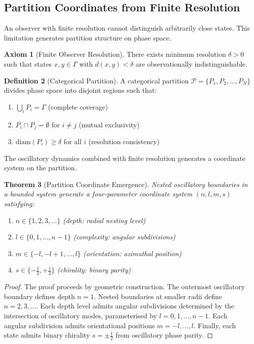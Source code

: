 \documentclass[twocolumn,10pt,a4paper]{article}
\newtheorem{theorem}{Theorem}[section]
\theoremstyle{definition}
\newtheorem{definition}[theorem]{Definition}
\newtheorem{axiom}[theorem]{Axiom}
\theoremstyle{remark}
\newcommand{\partition}{\mathcal{P}}
\begin{document}
\subsection{Partition Coordinates from Finite Resolution}

An observer with finite resolution cannot distinguish arbitrarily close states. This limitation generates partition structure on phase space.

\begin{axiom}[Finite Observer Resolution]
\label{ax:resolution}
There exists minimum resolution $\delta > 0$ such that states $x, y \in \Gamma$ with $d(x, y) < \delta$ are observationally indistinguishable.
\end{axiom}

\begin{definition}[Categorical Partition]
\label{def:categorical_partition}
A categorical partition $\partition = \{P_1, P_2, \ldots, P_N\}$ divides phase space into disjoint regions such that:
\begin{enumerate}
\item $\bigcup_i P_i = \Gamma$ (complete coverage)
\item $P_i \cap P_j = \emptyset$ for $i \neq j$ (mutual exclusivity)
\item $\mathrm{diam}(P_i) \geq \delta$ for all $i$ (resolution consistency)
\end{enumerate}
\end{definition}

The oscillatory dynamics combined with finite resolution generates a coordinate system on the partition.

\begin{theorem}[Partition Coordinate Emergence]
\label{thm:partition_coords}
Nested oscillatory boundaries in a bounded system generate a four-parameter coordinate system $(n, l, m, s)$ satisfying:
\begin{enumerate}
\item $n \in \{1, 2, 3, \ldots\}$ (depth: radial nesting level)
\item $l \in \{0, 1, \ldots, n-1\}$ (complexity: angular subdivisions)
\item $m \in \{-l, -l+1, \ldots, l\}$ (orientation: azimuthal position)
\item $s \in \{-\frac{1}{2}, +\frac{1}{2}\}$ (chirality: binary parity)
\end{enumerate}
\end{theorem}

\begin{proof}
The proof proceeds by geometric construction. The outermost oscillatory boundary defines depth $n = 1$. Nested boundaries at smaller radii define $n = 2, 3, \ldots$. Each depth level admits angular subdivisions determined by the intersection of oscillatory modes, parameterised by $l = 0, 1, \ldots, n-1$. Each angular subdivision admits orientational positions $m = -l, \ldots, l$. Finally, each state admits binary chirality $s = \pm\frac{1}{2}$ from oscillatory phase parity.
\end{proof}
\end{document}

